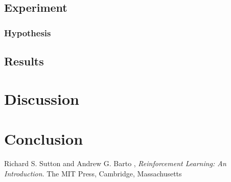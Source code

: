 \documentclass[a4paper,10pt]{article}
\begin{document}
\subsection{Experiment}



\subsubsection{Hypothesis}


\subsection{Results}







\section{Discussion}



\section{Conclusion}


\begin{thebibliography}{9}

  Richard S. Sutton and Andrew G. Barto ,
  \emph{Reinforcement Learning: An Introduction}.
  The MIT Press, Cambridge, Massachusetts

\end{thebibliography}
\end{document}
